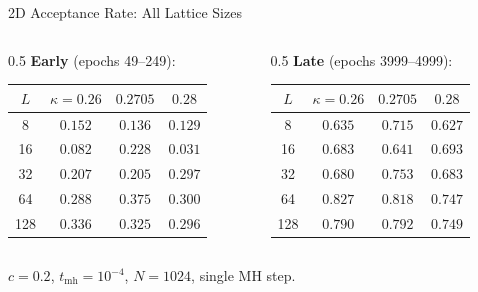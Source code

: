 \documentclass[10pt,UTF8]{beamer}
\begin{document}
\begin{frame}{2D Acceptance Rate: All Lattice Sizes}
\begin{columns}[T]
\begin{column}{0.5\textwidth}
    {\small \textbf{Early} (epochs 49--249):}
    \vspace{0.1cm}

    {\footnotesize
    \begin{tabular}{cccc}
    \toprule
    $L$ & $\kappa\!=\!0.26$ & $0.2705$ & $0.28$ \\
    \midrule
    8   & $0.152$ & $0.136$ & $0.129$ \\
    16  & $0.082$ & $0.228$ & $0.031$ \\
    32  & $0.207$ & $0.205$ & $0.297$ \\
    64  & $0.288$ & $0.375$ & $0.300$ \\
    128 & $0.336$ & $0.325$ & $0.296$ \\
    \bottomrule
    \end{tabular}
    }
\end{column}
\begin{column}{0.5\textwidth}
    {\small \textbf{Late} (epochs 3999--4999):}
    \vspace{0.1cm}

    {\footnotesize
    \begin{tabular}{cccc}
    \toprule
    $L$ & $\kappa\!=\!0.26$ & $0.2705$ & $0.28$ \\
    \midrule
    8   & $0.635$ & $0.715$ & $0.627$ \\
    16  & $0.683$ & $0.641$ & $0.693$ \\
    32  & $0.680$ & $0.753$ & $0.683$ \\
    64  & $0.827$ & $0.818$ & $0.747$ \\
    128 & $0.790$ & $0.792$ & $0.749$ \\
    \bottomrule
    \end{tabular}
    }
\end{column}
\end{columns}
\vspace{0.4cm}
$c=0.2$, $t_\text{mh}=10^{-4}$, $N=1024$, single MH step.
\end{frame}
\end{document}
